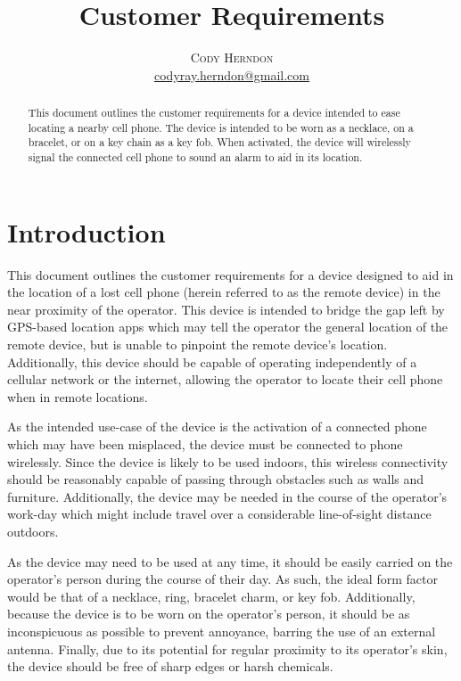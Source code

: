 \documentclass[twoside]{article}
\title{\vspace{-15mm}\fontsize{24pt}{10pt}\selectfont\textbf{Customer Requirements}} %
\author{
\large
\textsc{Cody Herndon}\\[2mm] %
\normalsize \href{mailto:codyray.herndon@gmail.com}{codyray.herndon@gmail.com} %
\vspace{-5mm}
}
\date{}
\begin{document}
\maketitle %

\thispagestyle{fancy} %


\begin{abstract}

\noindent This document outlines the customer requirements for a device intended to ease locating a nearby cell phone.  The device is intended to be worn as a necklace, on a bracelet, or on a key chain as a key fob.  When activated, the device will wirelessly signal the connected cell phone to sound an alarm to aid in its location.

\end{abstract}


\section{Introduction}

This document outlines the customer requirements for a device designed to aid in the location of a lost cell phone (herein referred to as the remote device) in the near proximity of the operator.  This device is intended to bridge the gap left by GPS-based location apps which may tell the operator the general location of the remote device, but is unable to pinpoint the remote device's location.  Additionally, this device should be capable of operating independently of a cellular network or the internet, allowing the operator to locate their cell phone when in remote locations.

As the intended use-case of the device is the activation of a connected phone which may have been misplaced, the device must be connected to phone wirelessly.  Since the device is likely to be used indoors, this wireless connectivity should be reasonably capable of passing through obstacles such as walls and furniture.  Additionally, the device may be needed in the course of the operator's work-day which might include travel over a considerable line-of-sight distance outdoors.

As the device may need to be used at any time, it should be easily carried on the operator's person during the course of their day.  As such, the ideal form factor would be that of a necklace, ring, bracelet charm, or key fob.  Additionally, because the device is to be worn on the operator's person, it should be as inconspicuous as possible to prevent annoyance, barring the use of an external antenna.  Finally, due to its potential for regular proximity to its operator's skin, the device should be free of sharp edges or harsh chemicals.
\end{document}
